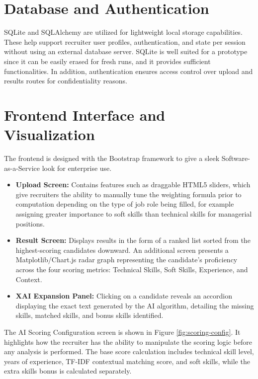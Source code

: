\section{Database and Authentication}
SQLite and SQLAlchemy are utilized for lightweight local storage capabilities. These help support recruiter user profiles, authentication, and state per session without using an external database server. SQLite is well suited for a prototype since it can be easily erased for fresh runs, and it provides sufficient functionalities. In addition, authentication ensures access control over upload and results routes for confidentiality reasons.

\section{Frontend Interface and Visualization}
The frontend is designed with the Bootstrap framework to give a sleek Software-as-a-Service look for enterprise use.

\begin{itemize}
    \item \textbf{Upload Screen:} Contains features such as draggable HTML5 sliders, which give recruiters the ability to manually tune the weighting formula prior to computation depending on the type of job role being filled, for example assigning greater importance to soft skills than technical skills for managerial positions.
    
    \item \textbf{Result Screen:} Displays results in the form of a ranked list sorted from the highest-scoring candidates downward. An additional screen presents a Matplotlib/Chart.js radar graph representing the candidate's proficiency across the four scoring metrics: Technical Skills, Soft Skills, Experience, and Context.
    
    \item \textbf{XAI Expansion Panel:} Clicking on a candidate reveals an accordion displaying the exact text generated by the AI algorithm, detailing the missing skills, matched skills, and bonus skills identified.
\end{itemize}

The AI Scoring Configuration screen is shown in Figure \ref{fig:scoring-config}. It highlights how the recruiter has the ability to manipulate the scoring logic before any analysis is performed. The base score calculation includes technical skill level, years of experience, TF-IDF contextual matching score, and soft skills, while the extra skills bonus is calculated separately.

